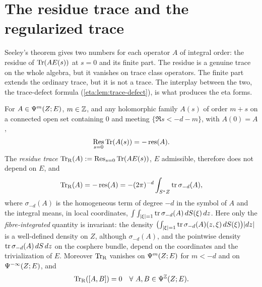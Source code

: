 \section{The residue trace and the regularized trace}\label{eta:sec:residue}

Seeley's theorem gives two numbers for each operator $A$ of integral order: the
residue of $\operatorname{Tr}(AE(s))$ at $s=0$ and its finite part. The residue is a genuine
trace on the whole algebra, but it vanishes on trace class operators. The finite
part extends the ordinary trace, but it is not a trace. The interplay between the
two, the trace-defect formula (\cref{eta:lem:trace-defect}), is what produces the
eta forms.

\begin{proposition}\label{eta:prop:residue}
For $A\in\Psi^{m}(Z;E)$, $m\in\mathbb{Z}$, and any holomorphic family $A(s)$ of order $m+s$
on a connected open set containing $0$ and meeting $\{\Re s<-d-m\}$, with
$A(0)=A$,
\[
\operatorname*{Res}_{s=0}\operatorname{Tr}(A(s))=-\operatorname{res}(A).
\]
The \emph{residue trace} $\operatorname{Tr}_{\mathrm{R}}(A):=\operatorname*{Res}_{s=0}\operatorname{Tr}(AE(s))$, $E$ admissible,
therefore does not depend on $E$, and
\begin{equation}\label{eta:eq:residue-formula}
\operatorname{Tr}_{\mathrm{R}}(A)=-\operatorname{res}(A)=-(2\pi)^{-d}\int_{S^*Z}\operatorname{tr}\sigma_{-d}(A),
\end{equation}
where $\sigma_{-d}(A)$ is the homogeneous term of degree $-d$ in the symbol of $A$ and the
integral means, in local coordinates, $\int\int_{\lvert \xi\rvert=1}\operatorname{tr}\sigma_{-d}(A)\,dS(\xi)\,dz$.
Here only the \emph{fibre-integrated} quantity is invariant: the density
$\bigl(\int_{\lvert \xi\rvert=1}\operatorname{tr}\sigma_{-d}(A)(z,\xi)\,dS(\xi)\bigr)\lvert dz\rvert$ is a well-defined
density on $Z$, although $\sigma_{-d}(A)$, and the pointwise density
$\operatorname{tr}\sigma_{-d}(A)\,dS\,dz$ on the cosphere bundle, depend on the coordinates and the
trivialization of $E$. Moreover $\operatorname{Tr}_{\mathrm{R}}$ vanishes on $\Psi^{m}(Z;E)$ for $m<-d$ and on
$\Psi^{-\infty}(Z;E)$, and
\[
\TrR([A,B])=0\quad\forall\ A,B\in\Psido{\Z}(Z;E).
\]
\end{proposition}

